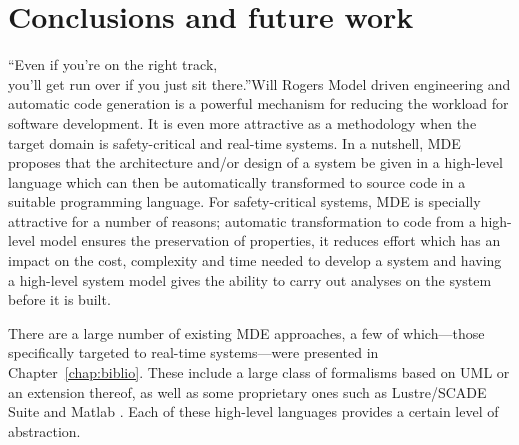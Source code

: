 \chapter{Conclusions and future work}{``Even if you're on the right
  track,\\you'll get run over if you just sit there.''}{Will Rogers}
\label{chap:conclusions}
Model driven engineering and automatic code generation is a powerful
mechanism for reducing the workload for software development. It is
even more attractive as a methodology when the target domain is
safety-critical and real-time systems. In a nutshell, MDE proposes that
the architecture and/or design of a system be given in a high-level
language which can then be automatically transformed to source code in
a suitable programming language. For safety-critical systems, MDE is
specially attractive for a number of reasons; automatic transformation
to code from a high-level model ensures the preservation of
properties, it reduces effort which has an impact on the cost,
complexity and time needed to develop a system and having a high-level
system model gives the ability to carry out analyses on the system
before it is built.

There are a large number of existing MDE approaches, a few of
which---those specifically targeted to real-time systems---were
presented in Chapter~\ref{chap:biblio}. These include a large class of
formalisms based on UML or an extension thereof, as well as some
proprietary ones such as Lustre/SCADE Suite and Matlab \simu. Each of
these high-level languages provides a certain level of abstraction. 


